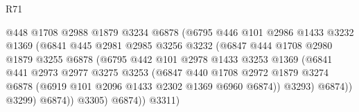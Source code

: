 \begin{lexlean}{R71}
\begin{coremodule}
                                    @448
                                    @1708
                                    @2988
                                    @1879
                                    @3234
                                    @6878
                                    (@6795
                                      @446
                                      @101
                                      @2986
                                      @1433
                                      @3232
                                      @1369
                                      (@6841
                                        @445
                                        @2981
                                        @2985
                                        @3256
                                        @3232
                                        (@6847
                                          @444
                                          @1708
                                          @2980
                                          @1879
                                          @3255
                                          @6878
                                          (@6795
                                            @442
                                            @101
                                            @2978
                                            @1433
                                            @3253
                                            @1369
                                            (@6841
                                              @441
                                              @2973
                                              @2977
                                              @3275
                                              @3253
                                              (@6847
                                                @440
                                                @1708
                                                @2972
                                                @1879
                                                @3274
                                                @6878
                                                (@6919 @101 @2096 @1433 @2302 @1369 @6960 @6874))
                                              @3293)
                                            @6874))
                                        @3299)
                                      @6874))
                                  @3305)
                                @6874))
                            @3311)

\end{coremodule}
\end{lexlean}
